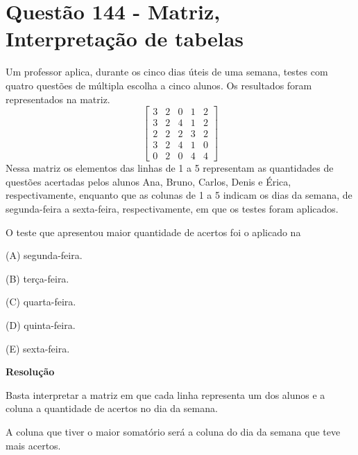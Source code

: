 \section{Questão 144 - Matriz, Interpretação de tabelas}

Um professor aplica, durante os cinco dias úteis de uma semana, testes com quatro questões de múltipla escolha a cinco alunos. Os resultados foram representados na matriz.
\[ 
    \left[ 
        \begin{matrix}
           3 & 2 & 0 & 1 & 2 \\
           3 & 2 & 4 & 1 & 2 \\
           2 & 2 & 2 & 3 & 2 \\
           3 & 2 & 4 & 1 & 0 \\
           0 & 2 & 0 & 4 & 4
        \end{matrix}
    \right] 
 \]
Nessa matriz os elementos das linhas de 1 a 5 representam as quantidades de questões acertadas pelos alunos Ana, Bruno, Carlos, Denis e Érica, respectivamente, enquanto que as colunas de 1 a 5 indicam os dias da semana, de segunda-feira a sexta-feira, respectivamente, em que os testes foram aplicados.

O teste que apresentou maior quantidade de acertos foi o aplicado na

(A)  segunda-feira.

(B)  terça-feira.

(C)  quarta-feira.

(D) quinta-feira.

(E)  sexta-feira.

\textbf{Resolução}

Basta interpretar a matriz em que cada linha representa um dos alunos e a coluna a quantidade de acertos no dia da semana. 

A coluna que tiver o maior somatório será a coluna do dia da semana que teve mais acertos.

\newcommand{\myunit}{1 cm}
\newcommand{\nodeRectColumn}[6]{
    \draw [ color={#1}  ,draw opacity=1 ] (A-#2-#4.north west) -- (A-#2-#5.north east) -- (A-#3-#5.south east) -- (A-#3-#4.south west) -- cycle;
    \node [ color={#1}  ,below = of A-#3-#4.south] (A-#3-#4-s) {#6};
    \draw [ color={#1}  ,draw opacity=1, -> ]   (A-#3-#4.south) -- (A-#3-#4-s) ; 
}

\newcommand{\LinhaExplicativa}[3] {
    \node [ color={#1}  ,left = of A-#2-1.west] (A-#2-1-l) {#3}; \draw [  color={#1}  , draw opacity=1, -> ]   (A-#2-1-l.east) -- (A-#2-1.west) ; 
}

